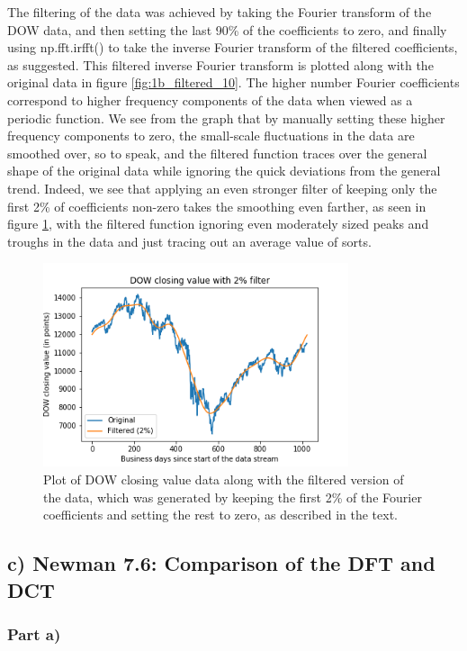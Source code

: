 \documentclass{article}
\begin{document}
The filtering of the data was achieved by taking the Fourier transform of the DOW data, and then setting the last 90\% of the coefficients to zero, and finally using np.fft.irfft() to take the inverse Fourier transform of the filtered coefficients, as suggested. This filtered inverse Fourier transform is plotted along with the original data in figure \ref{fig:1b_filtered_10}. The higher number Fourier coefficients correspond to higher frequency components of the data when viewed as a periodic function. We see from the graph that by manually setting these higher frequency components to zero, the small-scale fluctuations in the data are smoothed over, so to speak, and the filtered function traces over the general shape of the original data while ignoring the quick deviations from the general trend. Indeed, we see that applying an even stronger filter of keeping only the first 2\% of coefficients non-zero takes the smoothing even farther, as seen in figure \ref{fig:1b_filtered_02}, with the filtered function ignoring even moderately sized peaks and troughs in the data and just tracing out an average value of sorts.

\begin{figure}[H]
	\centering
	\includegraphics[width=0.8\textwidth]{../images/1b_filtered_02.png}
	\caption{Plot of DOW closing value data along with the filtered version of the data, which was generated by keeping the first 2\% of the Fourier coefficients and setting the rest to zero, as described in the text.}
	\label{fig:1b_filtered_02}
\end{figure}

\subsection{c) Newman 7.6: Comparison of the DFT and DCT}

\subsubsection{Part a)}
\end{document}
